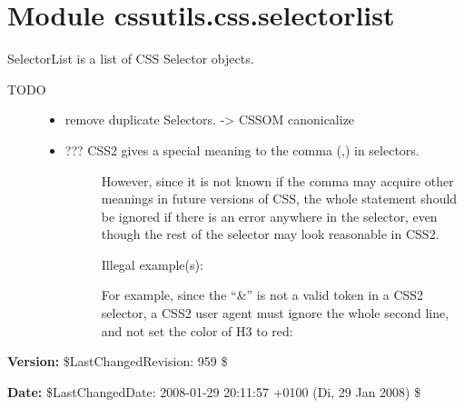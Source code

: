 %
%
%


\section{Module cssutils.css.selectorlist}

    \label{cssutils:css:selectorlist}

SelectorList is a list of CSS Selector objects.
\begin{description}
\item[{TODO}] \leavevmode \begin{itemize}
\item {} 
remove duplicate Selectors. -{\textgreater} CSSOM canonicalize

\item {} \begin{description}
\item[{??? CSS2 gives a special meaning to the comma (,) in selectors.}] \leavevmode 
However, since it is not known if the comma may acquire other
meanings in future versions of CSS, the whole statement should be
ignored if there is an error anywhere in the selector, even though
the rest of the selector may look reasonable in CSS2.

Illegal example(s):

For example, since the ``{\&}'' is not a valid token in a CSS2 selector,
a CSS2 user agent must ignore the whole second line, and not set
the color of H3 to red:

\end{description}

\end{itemize}

\end{description}
\textbf{Version:} \$LastChangedRevision: 959 \$



\textbf{Date:} \$LastChangedDate: 2008-01-29 20:11:57 +0100 (Di, 29 Jan 2008) \$



